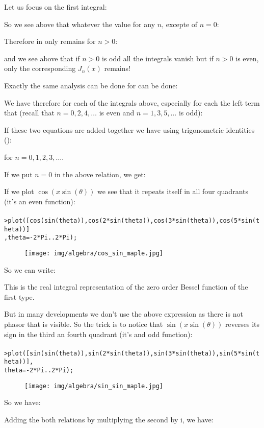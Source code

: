 	Let us focus on the first integral:
	
	So we see above that whatever the value for any $n$, excepte of $n=0$:
	
	Therefore in only remains for $n>0$:
	
	and we see above that if $n>0$ is odd all the integrals vanish but if $n>0$ is even, only the corresponding $J_n(x)$ remains!
	
	Exactly the same analysis can be done for can be done:
	
	We have therefore for each of the integrals above, especially for each the left term that (recall that $n=0,2,4,\ldots$ is even and $n=1,3,5,\ldots$ is odd):
	
	If these two equations are added together we have using trigonometric identities ():
	
	for $n=0,1,2,3,\ldots$.
	
	If we put $n=0$ in the above relation, we get:
	
	If we plot $\cos(x\sin(\theta))$ we see that it repeats itself in all four quadrants (it's an even function):\\\\
	\texttt{>plot([cos(sin(theta)),cos(2*sin(theta)),cos(3*sin(theta)),cos(5*sin(theta))]\\
	,theta=-2*Pi..2*Pi);}
	\begin{figure}[H]
		\centering
		\texttt{[image: img/algebra/cos\_sin\_maple.jpg]}
	\end{figure}
	So we can write:
	
	This is the real integral representation of the zero order Bessel function of the first type.
	
	But in many developments we don't use the above expression as there is not phasor that is visible. So the trick is to notice that $\sin(x\sin(\theta))$ reverses its sign in the third an fourth quadrant (it's and odd function):\\\\
		\texttt{>plot([sin(sin(theta)),sin(2*sin(theta)),sin(3*sin(theta)),sin(5*sin(theta))],\\
	theta=-2*Pi..2*Pi);}
	\begin{figure}[H]
		\centering
		\texttt{[image: img/algebra/sin\_sin\_maple.jpg]}
	\end{figure}
	So we have:
	
	Adding the both relations by multiplying the second by $\mathrm{i}$,  we have:
	
